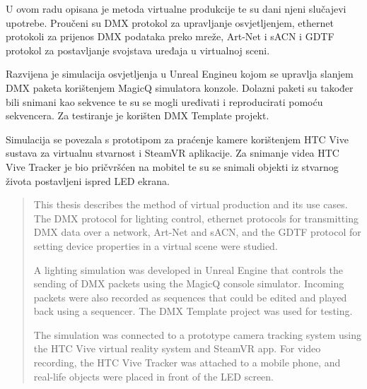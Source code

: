\documentclass[times, utf8, zavrsni, numeric]{fer}
\begin{document}
\raggedright



\begin{sazetak}
U ovom radu opisana je metoda virtualne produkcije te su dani njeni slučajevi upotrebe. Proučeni su DMX protokol za upravljanje osvjetljenjem, ethernet protokoli za prijenos DMX podataka preko mreže, Art-Net i sACN i GDTF protokol za postavljanje svojstava uređaja u virtualnoj sceni. \newline

Razvijena je simulacija osvjetljenja u Unreal Engineu kojom se upravlja slanjem DMX paketa korištenjem MagicQ simulatora konzole. Dolazni paketi su također bili snimani kao sekvence te su se mogli uređivati i reproducirati pomoću sekvencera. Za testiranje je korišten DMX Template projekt. \newline

Simulacija se povezala s prototipom za praćenje kamere korištenjem HTC Vive sustava za virtualnu stvarnost i SteamVR aplikacije. Za snimanje videa HTC Vive Tracker je bio pričvršćen na mobitel te su se snimali objekti iz stvarnog života postavljeni ispred LED ekrana.

\end{sazetak}

\pagebreak

\begin{abstract}
This thesis describes the method of virtual production and its use cases. The DMX protocol for lighting control, ethernet protocols for transmitting DMX data over a network, Art-Net and sACN, and the GDTF protocol for setting device properties in a virtual scene were studied. \newline

A lighting simulation was developed in Unreal Engine that controls the sending of DMX packets using the MagicQ console simulator. Incoming packets were also recorded as sequences that could be edited and played back using a sequencer. The DMX Template project was used for testing. \newline

The simulation was connected to a prototype camera tracking system using the HTC Vive virtual reality system and SteamVR app. For video recording, the HTC Vive Tracker was attached to a mobile phone, and real-life objects were placed in front of the LED screen.

\end{abstract}
\end{document}
